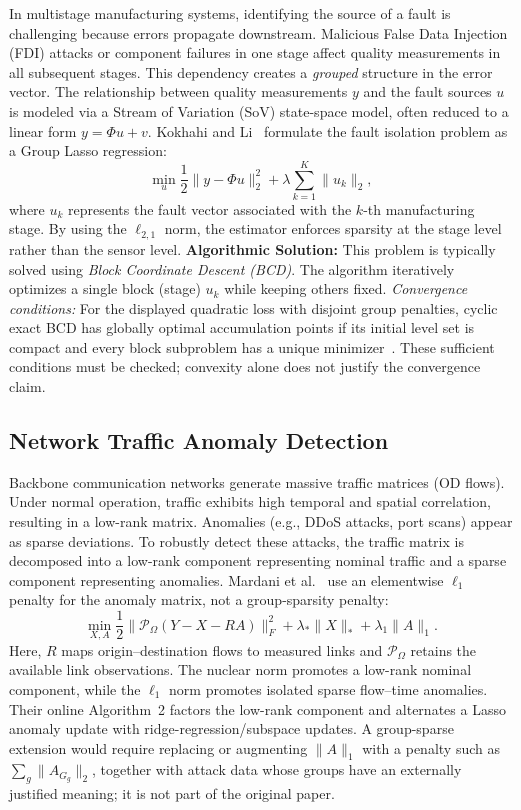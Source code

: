 \documentclass[12pt]{article}
\begin{document}
In multistage manufacturing systems, identifying the source of a fault is challenging because errors propagate downstream. Malicious False Data Injection (FDI) attacks or component failures in one stage affect quality measurements in all subsequent stages. This dependency creates a \textit{grouped} structure in the error vector.
The relationship between quality measurements $y$ and the fault sources $u$ is modeled via a Stream of Variation (SoV) state-space model, often reduced to a linear form $y = \Phi u + v$. Kokhahi and Li~\cite{GLHAD} formulate the fault isolation problem as a Group Lasso regression:
\[
    \min_{u} \frac{1}{2} \|y - \Phi u\|_2^2 + \lambda \sum_{k=1}^K \|u_k\|_2,
\]
where $u_k$ represents the fault vector associated with the $k$-th manufacturing stage. By using the $\ell_{2,1}$ norm, the estimator enforces sparsity at the stage level rather than the sensor level.
\textbf{Algorithmic Solution:} This problem is typically solved using \textit{Block Coordinate Descent (BCD)}. The algorithm iteratively optimizes a single block (stage) $u_k$ while keeping others fixed.
\textit{Convergence conditions:} For the displayed quadratic loss with disjoint group penalties, cyclic exact BCD has globally optimal accumulation points if its initial level set is compact and every block subproblem has a unique minimizer~\cite{Tseng2001}. These sufficient conditions must be checked; convexity alone does not justify the convergence claim.

\subsection{Network Traffic Anomaly Detection}

Backbone communication networks generate massive traffic matrices (OD flows). Under normal operation, traffic exhibits high temporal and spatial correlation, resulting in a low-rank matrix. Anomalies (e.g., DDoS attacks, port scans) appear as sparse deviations.
To robustly detect these attacks, the traffic matrix is decomposed into a low-rank component representing nominal traffic and a sparse component representing anomalies. Mardani et al.~\cite{Mardani} use an elementwise $\ell_1$ penalty for the anomaly matrix, not a group-sparsity penalty:
\[
    \min_{X,A} \frac{1}{2}\|\mathcal{P}_{\Omega}(Y-X-RA)\|_F^2
    + \lambda_*\|X\|_* + \lambda_1\|A\|_1.
\]
Here, $R$ maps origin--destination flows to measured links and $\mathcal{P}_{\Omega}$ retains the available link observations. The nuclear norm promotes a low-rank nominal component, while the $\ell_1$ norm promotes isolated sparse flow--time anomalies. Their online Algorithm~2 factors the low-rank component and alternates a Lasso anomaly update with ridge-regression/subspace updates. A group-sparse extension would require replacing or augmenting $\|A\|_1$ with a penalty such as $\sum_g\|A_{G_g}\|_2$, together with attack data whose groups have an externally justified meaning; it is not part of the original paper.
\end{document}
